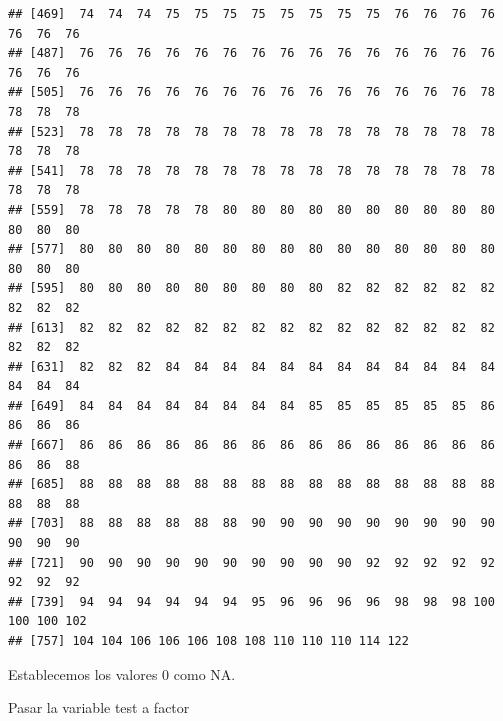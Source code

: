 \documentclass[
]{article}
\newenvironment{Shaded}{\begin{snugshade}}{\end{snugshade}}
\newcommand{\ConstantTok}[1]{\textcolor[rgb]{0.00,0.00,0.00}{#1}}
\newcommand{\DecValTok}[1]{\textcolor[rgb]{0.00,0.00,0.81}{#1}}
\newcommand{\NormalTok}[1]{#1}
\newcommand{\OtherTok}[1]{\textcolor[rgb]{0.56,0.35,0.01}{#1}}
\newcommand{\SpecialCharTok}[1]{\textcolor[rgb]{0.00,0.00,0.00}{#1}}
\begin{document}
\begin{verbatim}
## [469]  74  74  74  75  75  75  75  75  75  75  75  76  76  76  76  76  76  76
## [487]  76  76  76  76  76  76  76  76  76  76  76  76  76  76  76  76  76  76
## [505]  76  76  76  76  76  76  76  76  76  76  76  76  76  76  78  78  78  78
## [523]  78  78  78  78  78  78  78  78  78  78  78  78  78  78  78  78  78  78
## [541]  78  78  78  78  78  78  78  78  78  78  78  78  78  78  78  78  78  78
## [559]  78  78  78  78  78  80  80  80  80  80  80  80  80  80  80  80  80  80
## [577]  80  80  80  80  80  80  80  80  80  80  80  80  80  80  80  80  80  80
## [595]  80  80  80  80  80  80  80  80  80  82  82  82  82  82  82  82  82  82
## [613]  82  82  82  82  82  82  82  82  82  82  82  82  82  82  82  82  82  82
## [631]  82  82  82  84  84  84  84  84  84  84  84  84  84  84  84  84  84  84
## [649]  84  84  84  84  84  84  84  84  85  85  85  85  85  85  86  86  86  86
## [667]  86  86  86  86  86  86  86  86  86  86  86  86  86  86  86  86  86  88
## [685]  88  88  88  88  88  88  88  88  88  88  88  88  88  88  88  88  88  88
## [703]  88  88  88  88  88  88  90  90  90  90  90  90  90  90  90  90  90  90
## [721]  90  90  90  90  90  90  90  90  90  90  92  92  92  92  92  92  92  92
## [739]  94  94  94  94  94  94  95  96  96  96  96  98  98  98 100 100 100 102
## [757] 104 104 106 106 106 108 108 110 110 110 114 122
\end{verbatim}

Establecemos los valores 0 como NA.

\begin{Shaded}
\end{Shaded}

Pasar la variable test a factor
\end{document}
